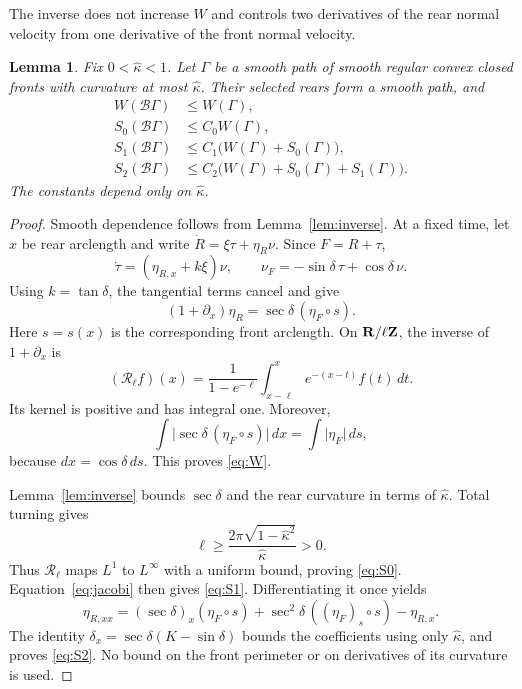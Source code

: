 \documentclass[11pt]{article}
\numberwithin{equation}{section}
\newtheorem{lemma}[theorem]{Lemma}
\newcommand{\R}{{\bf R}}
\newcommand{\Z}{{\bf Z}}
\newcommand{\Bmap}{\mathcal B}
\newcommand{\abs}[1]{\lvert #1\rvert}
\begin{document}
The inverse does not increase \(W\) and controls two derivatives of the
rear normal velocity from one derivative of the front normal velocity.

\begin{lemma}\label{lem:jacobi}
Fix \(0<\widehat\kappa<1\). Let \(\Gamma\) be a smooth path of smooth
regular convex closed fronts with curvature at most \(\widehat\kappa\).
Their selected rears form a smooth path, and
\begin{align}
  W(\Bmap\Gamma)&\leq W(\Gamma),\label{eq:W}\\
  S_0(\Bmap\Gamma)&\leq C_0W(\Gamma),\label{eq:S0}\\
  S_1(\Bmap\Gamma)&\leq C_1\bigl(W(\Gamma)+S_0(\Gamma)\bigr),\label{eq:S1}\\
  S_2(\Bmap\Gamma)&\leq C_2\bigl(W(\Gamma)+S_0(\Gamma)+S_1(\Gamma)\bigr).
    \label{eq:S2}
\end{align}
The constants depend only on \(\widehat\kappa\).
\end{lemma}

\begin{proof}
Smooth dependence follows from Lemma~\ref{lem:inverse}. At a fixed time,
let \(x\) be rear arclength and write \(\dot R=\xi\tau+\eta_R\nu\).
Since \(F=R+\tau\),
\[
  \dot\tau=(\eta_{R,x}+k\xi)\nu,\qquad
  \nu_F=-\sin\delta\,\tau+\cos\delta\,\nu.
\]
Using \(k=\tan\delta\), the tangential terms cancel and give
\begin{equation}\label{eq:jacobi}
  (1+\partial_x)\eta_R=\sec\delta\,(\eta_F\circ s).
\end{equation}
Here \(s=s(x)\) is the corresponding front arclength. On
\(\R/\ell\Z\), the inverse of \(1+\partial_x\) is
\[
  (\mathcal R_\ell f)(x)=\frac1{1-e^{-\ell}}
      \int_{x-\ell}^x e^{-(x-t)}f(t)\,dt.
\]
Its kernel is positive and has integral one. Moreover,
\[
  \int\abs{\sec\delta\,(\eta_F\circ s)}\,dx
  =\int\abs{\eta_F}\,ds,
\]
because \(dx=\cos\delta\,ds\). This proves \eqref{eq:W}.

Lemma~\ref{lem:inverse} bounds \(\sec\delta\) and the rear curvature in
terms of \(\widehat\kappa\). Total turning gives
\[
  \ell\geq\frac{2\pi\sqrt{1-\widehat\kappa^2}}{\widehat\kappa}>0.
\]
Thus \(\mathcal R_\ell\) maps \(L^1\) to \(L^\infty\) with a uniform
bound, proving \eqref{eq:S0}. Equation~\eqref{eq:jacobi} then gives
\eqref{eq:S1}. Differentiating it once yields
\[
  \eta_{R,xx}=(\sec\delta)_x(\eta_F\circ s)
       +\sec^2\delta\,((\eta_F)_s\circ s)-\eta_{R,x}.
\]
The identity \(\delta_x=\sec\delta(K-\sin\delta)\) bounds the coefficients
using only \(\widehat\kappa\), and proves \eqref{eq:S2}. No bound on the
front perimeter or on derivatives of its curvature is used.
\end{proof}
\end{document}
